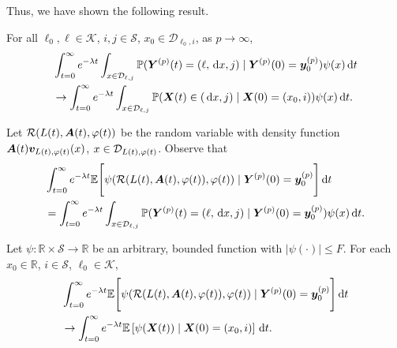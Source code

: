Thus, we have shown the following result.
\begin{lem}\label{lem: KajPOw}
	For all \(\ell_0,\ell\in\mathcal K\), \(i,j\in\mathcal S\), \(x_0\in\mathcal D_{\ell_0,i}\), as \(p\to\infty\), 
	\begin{align}
		&\int_{t=0}^\infty e^{-\lambda t}\int_{x\in\mathcal D_{\ell,j}}\mathbb P( {\boldsymbol Y}^{(p)}(t) = (\ell,\, \mathrm{d} x,j) \mid \boldsymbol Y^{(p)}(0)=\boldsymbol y_0^{(p)})  \psi(x)\, \mathrm{d} t \nonumber
		\\&\to \int_{t=0}^\infty e^{-\lambda t}  \int_{x\in\mathcal{D}_{\ell,j}} \mathbb P(\boldsymbol X(t)\in(\, \mathrm{d} x, j)  
		\mid \boldsymbol X(0)=(x_0, i))\psi(x)\, \mathrm{d} t. \nonumber
	\end{align}
\end{lem}
 
Let \(\mathcal R(L(t),\boldsymbol A(t),\varphi(t))\) be the random variable with density function \(\boldsymbol A(t)\boldsymbol v_{L(t),\varphi(t)}(x)\), \(x\in\mathcal{D}_{L(t),\varphi(t)}\). Observe that 
\begin{align}
	&\int_{t=0}^\infty e^{-\lambda t}\mathbb E\Bigg[\psi(\mathcal R(L(t),\boldsymbol A(t),\varphi(t)),\varphi(t) )  \mid \nonumber
	\boldsymbol Y^{(p)}(0)=\boldsymbol y_0^{(p)} \Bigg] \, \mathrm{d} t 
	\\&=\int_{t=0}^\infty e^{-\lambda t}\int_{x\in\mathcal D_{\ell,j}}\mathbb P( {\boldsymbol Y}^{(p)}(t) = (\ell,\, \mathrm{d} x,j) \mid \boldsymbol Y^{(p)}(0)=\boldsymbol y_0^{(p)})  \psi(x)\, \mathrm{d} t.
\end{align}

\begin{cor}\label{cor: lk}
	Let \(\psi: \mathbb R\times \mathcal S \to \mathbb R\) be an arbitrary, bounded function with \(|\psi(\cdot)|\leq F\). %
	For each \(x_0\in\mathbb R\), \(i\in\mathcal S\), \(\ell_0\in\mathcal K\), 
	\begin{align}
		&\int_{t=0}^\infty e^{-\lambda t}\mathbb E\Bigg[\psi(\mathcal R(L(t),\boldsymbol A(t),\varphi(t)),\varphi(t) )  \mid \nonumber
		\boldsymbol Y^{(p)}(0)=\boldsymbol y_0^{(p)} \Bigg] \, \mathrm{d} t \nonumber
		\\&\to \int_{t=0}^\infty e^{-\lambda t}  \mathbb E\left[\psi({\boldsymbol X}(t))\mid \boldsymbol X(0)=(x_0, i) \right] \, \mathrm{d} t.\nonumber
	\end{align}
\end{cor}

